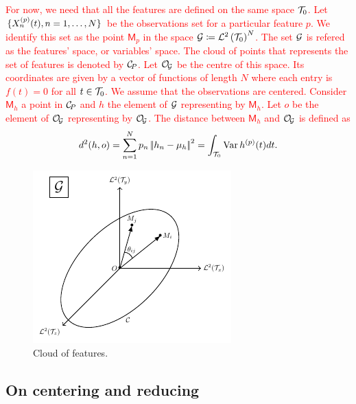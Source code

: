 \textcolor{red}{For now, we need that all the features are defined on the same space $\mathcal{T}_{0}$.
Let $\{X_n^{(p)}(t), n = 1, \dots, N\}$ be the observations set for a particular feature $p$. We identify this set as the point $\mathsf{M}_p$ in the space $\mathcal{G} \coloneqq \mathcal{L}^{2}\left(\mathcal{T}_{0}\right)^N$. The set $\mathcal{G}$ is refered as the features' space, or variables' space. The cloud of points that represents the set of features is denoted by $\mathcal{C}_{\!P}$. Let $\mathcal{O}_{\!\mathcal{G}}$ be the centre of this space. Its coordinates are given by a vector of functions of length $N$ where each entry is $f(t) = 0$ for all $t \in \mathcal{T}_{0}$.
We assume that the observations are centered. Consider $\mathsf{M}_h$ a point in $\mathcal{C}_{\!P}$ and $h$ the element of $\mathcal{G}$ representing by $\mathsf{M}_h$. Let $o$ be the element of $\mathcal{O}_{\!\mathcal{G}}$ representing by $\mathcal{O}_{\!\mathcal{G}}$. The distance between $\mathsf{M}_h$ and $\mathcal{O}_{\!\mathcal{G}}$ is defined as
\begin{equation*}
d^2(h, o) = \sum_{n = 1}^N p_n \left|\!\left|h_n - \mu_h\right|\!\right|^2 = \int_{\mathcal{T}_{0}} \operatorname{Var} h^{(p)}(t)dt.
\end{equation*}
}

\begin{figure}
    \centering
    \includegraphics[scale=1.2]{figures/cloud_features.pdf}
    \caption{Cloud of features.}
    \label{fig:cloud_features}
\end{figure}

\subsection{On centering and reducing} %
\label{sub:on_centering_and_reducing}

